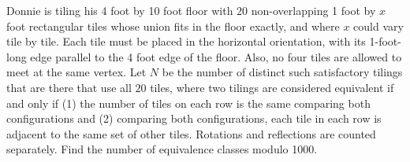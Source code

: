Donnie is tiling his 4 foot by 10 foot floor with $20$ non-overlapping 1 foot by $x$ foot rectangular tiles whose union fits in the floor exactly, and where $x$ could vary tile by tile. Each tile must be placed in the horizontal orientation, with its 1-foot-long edge parallel to the 4 foot edge of the floor. Also, no four tiles are allowed to meet at the same vertex. Let $N$ be the number of distinct such satisfactory tilings that are there that use all $20$ tiles, where two tilings are considered equivalent if and only if (1) the number of tiles on each row is the same comparing both configurations and (2) comparing both configurations, each tile in each row is adjacent to the same set of other tiles.  Rotations and reflections are counted separately. Find the number of equivalence classes modulo 1000.
